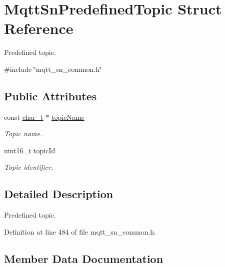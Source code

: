 \hypertarget{structMqttSnPredefinedTopic}{}\section{Mqtt\+Sn\+Predefined\+Topic Struct Reference}
\label{structMqttSnPredefinedTopic}


Predefined topic.  




{\ttfamily \#include \char`\"{}mqtt\+\_\+sn\+\_\+common.\+h\char`\"{}}

\subsection*{Public Attributes}
\begin{DoxyCompactItemize}
\item 
const \hyperlink{compiler__port_8h_a40bb5262bf908c328fbcfbe5d29d0201}{char\+\_\+t} $\ast$ \hyperlink{structMqttSnPredefinedTopic_a3d49d2c2e35b6fe7825f1f55c40357d9}{topic\+Name}
\begin{DoxyCompactList}\small\item\em Topic name. \end{DoxyCompactList}\item 
\hyperlink{stdint_8h_a273cf69d639a59973b6019625df33e30}{uint16\+\_\+t} \hyperlink{structMqttSnPredefinedTopic_a35af18e86bd1476cfc295b0b16308060}{topic\+Id}
\begin{DoxyCompactList}\small\item\em Topic identifier. \end{DoxyCompactList}\end{DoxyCompactItemize}


\subsection{Detailed Description}
Predefined topic. 

Definition at line 484 of file mqtt\+\_\+sn\+\_\+common.\+h.



\subsection{Member Data Documentation}
\mbox{\label{structMqttSnPredefinedTopic_a35af18e86bd1476cfc295b0b16308060}} 
